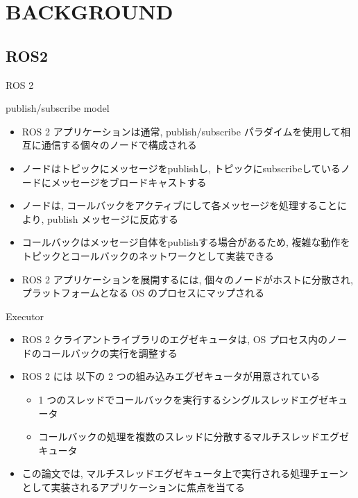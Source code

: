 

\section{BACKGROUND}
\label{sec: background}


\subsection{ROS2}
\label{ssec: ros2}

\begin{frame}{ROS 2}
\end{frame}

\begin{frame}{publish/subscribe model}
    \begin{itemize}
        \item ROS 2 アプリケーションは通常, publish/subscribe パラダイムを使用して相互に通信する個々のノードで構成される
        \item ノードはトピックにメッセージをpublishし, トピックにsubscribeしているノードにメッセージをブロードキャストする
        \item ノードは, コールバックをアクティブにして各メッセージを処理することにより, publish メッセージに反応する
        \item コールバックはメッセージ自体をpublishする場合があるため, 複雑な動作をトピックとコールバックのネットワークとして実装できる
        \item ROS 2 アプリケーションを展開するには, 個々のノードがホストに分散され, プラットフォームとなる OS のプロセスにマップされる
    \end{itemize}
\end{frame}

\begin{frame}{Executor}
    \begin{itemize}
        \item ROS 2 クライアントライブラリのエグゼキュータは, OS プロセス内のノードのコールバックの実行を調整する
        \item ROS 2 には 以下の 2 つの組み込みエグゼキュータが用意されている
              \begin{itemize}
                  \item 1 つのスレッドでコールバックを実行するシングルスレッドエグゼキュータ
                  \item コールバックの処理を複数のスレッドに分散するマルチスレッドエグゼキュータ
              \end{itemize}
        \item この論文では, マルチスレッドエグゼキュータ上で実行される処理チェーンとして実装されるアプリケーションに焦点を当てる
    \end{itemize}
\end{frame}

